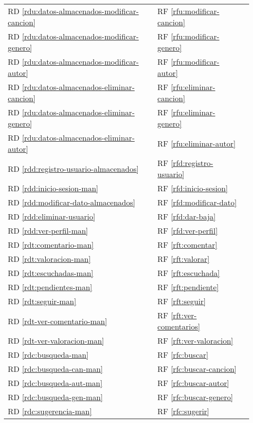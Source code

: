 \begin{tabularx}{\linewidth}{l|XXX}
  RD \ref{rdu:datos-almacenados-modificar-cancion} & & RF \ref{rfu:modificar-cancion} & \\
  RD \ref{rdu:datos-almacenados-modificar-genero} & & RF \ref{rfu:modificar-genero} & \\
  RD \ref{rdu:datos-almacenados-modificar-autor} & & RF \ref{rfu:modificar-autor} &\\
  RD \ref{rdu:datos-almacenados-eliminar-cancion} & & RF \ref{rfu:eliminar-cancion} & \\
  RD \ref{rdu:datos-almacenados-eliminar-genero}&  & RF \ref{rfu:eliminar-genero} & \\
  RD \ref{rdu:datos-almacenados-eliminar-autor} & & RF \ref{rfu:eliminar-autor} &\\

  RD \ref{rdd:registro-usuario-almacenados} & & RF \ref{rfd:registro-usuario} & \\
  RD \ref{rdd:inicio-sesion-man} & & RF \ref{rfd:inicio-sesion} & \\
  RD \ref{rdd:modificar-dato-almacenados} & & RF \ref{rfd:modificar-dato} & \\
  RD \ref{rdd:eliminar-usuario} & & RF \ref{rfd:dar-baja} & \\
  RD \ref{rdd:ver-perfil-man} & & RF \ref{rfd:ver-perfil} & \\
  RD \ref{rdt:comentario-man} & & RF \ref{rft:comentar} & \\
  RD \ref{rdt:valoracion-man} & & RF \ref{rft:valorar} & \\
  RD \ref{rdt:escuchadas-man} & & RF \ref{rft:escuchada} & \\
  RD \ref{rdt:pendientes-man} & & RF \ref{rft:pendiente} & \\
  RD \ref{rdt:seguir-man} & & RF \ref{rft:seguir} & \\
  RD \ref{rdt-ver-comentario-man} & & RF \ref{rft:ver-comentarios} & \\
  RD \ref{rdt-ver-valoracion-man} & & RF \ref{rft:ver-valoracion} & \\
  RD \ref{rdc:busqueda-man} && RF \ref{rfc:buscar} & \\
  RD \ref{rdc:busqueda-can-man} && RF \ref{rfc:buscar-cancion} & \\
  RD \ref{rdc:busqueda-aut-man} && RF \ref{rfc:buscar-autor} & \\
  RD \ref{rdc:busqueda-gen-man} && RF \ref{rfc:buscar-genero} & \\
  RD \ref{rdc:sugerencia-man} && RF \ref{rfc:sugerir} & \\


\end{tabularx}
